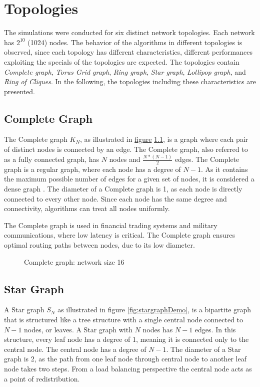 \chapter{Topologies}\label{chap:topologies}
The simulations were conducted for six distinct network topologies. Each network has $2^{10}$ (1024) nodes. The behavior of the algorithms in different topologies is observed, since each topology has different characteristics, different performances exploiting the specials of the topologies are expected. The topologies contain \textit{Complete graph}, \textit{Torus Grid graph}, \textit{Ring graph}, \textit{Star graph}, \textit{Lollipop graph}, and \textit{Ring of Cliques}. In the following, the topologies including these characteristics are presented.

\section{Complete Graph}\label{sec:2completegraph}
The Complete graph $K_N$, as illustrated in \hyperref[fig:completegraphDemo]{figure} \ref{fig:completegraphDemo}, is a graph where each pair of distinct nodes is connected by an edge. The Complete graph, also referred to as a fully connected graph, has $N$ nodes and $\frac{N*(N-1)}{2}$ edges. The Complete graph is a regular graph, where each node has a degree of $N-1$. As it contains the maximum possible number of edges for a given set of nodes, it is considered a dense graph \cite{GraphTheorySchindelhaauer2021}. The diameter of a Complete graph is 1, as each node is directly connected to every other node. Since each node has the same degree and connectivity, algorithms can treat all nodes uniformly.

The Complete graph is used in financial trading systems and military communications, where low latency is critical. The Complete graph ensures optimal routing paths between nodes, due to its low diameter. \cite{Banerjee2001}

\begin{figure}[H]
    \centering
    
    \caption{Complete graph: network size 16}
    \label{fig:completegraphDemo}
\end{figure}

\section{Star Graph}\label{sec:2stargraph}
A Star graph $S_N$ as illustrated in figure \ref{fig:stargraphDemo}, is a bipartite graph \cite{west2001introduction} that is structured like a tree structure with a single central node connected to $N-1$ nodes, or leaves. A Star graph with $N$ nodes has $N-1$ edges. In this structure, every leaf node has a degree of 1, meaning it is connected only to the central node. The central node has a degree of $N-1$. The diameter of a Star graph is 2, as the path from one leaf node through central node to another leaf node takes two steps. From a load balancing perspective the central node acts as a point of redistribution.

